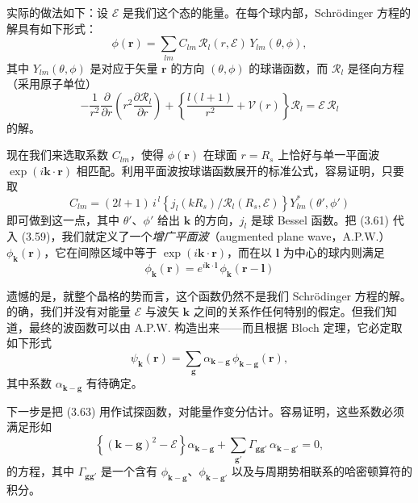 实际的做法如下：设 $\mathcal{E}$ 是我们这个态的能量。在每个球内部，Schrödinger 方程的解具有如下形式：
\begin{equation*}
\phi(\mathbf{r})=\sum_{lm}C_{lm}\,\mathcal{R}_l(r,\mathcal{E})\,Y_{lm}(\theta,\phi),\tag{3.59}
\end{equation*}
其中 $Y_{lm}(\theta,\phi)$ 是对应于矢量 $\mathbf{r}$ 的方向 $(\theta,\phi)$ 的球谐函数，而 $\mathcal{R}_l$ 是径向方程（采用原子单位）
\begin{equation*}
-\frac{1}{r^2}\frac{\partial}{\partial r}\left(r^2\frac{\partial\mathcal{R}_l}{\partial r}\right)+\left\{\frac{l(l+1)}{r^2}+\mathcal{V}(r)\right\}\mathcal{R}_l=\mathcal{E}\,\mathcal{R}_l\tag{3.60}
\end{equation*}
的解。

现在我们来选取系数 $C_{lm}$，使得 $\phi(\mathbf{r})$ 在球面 $r=R_s$ 上恰好与单一平面波 $\exp(i\mathbf{k}\cdot\mathbf{r})$ 相匹配。利用平面波按球谐函数展开的标准公式，容易证明，只要取
\begin{equation*}
C_{lm}=(2l+1)\,i^{\,l}\left\{j_l(kR_s)\big/\mathcal{R}_l(R_s,\mathcal{E})\right\}Y_{lm}^{*}(\theta',\phi')\tag{3.61}
\end{equation*}
即可做到这一点，其中 $\theta'$、$\phi'$ 给出 $\mathbf{k}$ 的方向，$j_l$ 是球 Bessel 函数。把 (3.61) 代入 (3.59)，我们就定义了一个\emph{增广平面波}（augmented plane wave，A.P.W.）$\phi_{\mathbf{k}}(\mathbf{r})$，它在间隙区域中等于 $\exp(i\mathbf{k}\cdot\mathbf{r})$，而在以 $\mathbf{l}$ 为中心的球内则满足
\begin{equation*}
\phi_{\mathbf{k}}(\mathbf{r})=e^{i\mathbf{k}\cdot\mathbf{l}}\,\phi_{\mathbf{k}}(\mathbf{r}-\mathbf{l})\tag{3.62}
\end{equation*}

遗憾的是，就整个晶格的势而言，这个函数仍然不是我们 Schrödinger 方程的解。的确，我们并没有对能量 $\mathcal{E}$ 与波矢 $\mathbf{k}$ 之间的关系作任何特别的假定。但我们知道，最终的波函数可以由 A.P.W. 构造出来——而且根据 Bloch 定理，它必定取如下形式
\begin{equation*}
\psi_{\mathbf{k}}(\mathbf{r})=\sum_{\mathbf{g}}\alpha_{\mathbf{k}-\mathbf{g}}\,\phi_{\mathbf{k}-\mathbf{g}}(\mathbf{r}),\tag{3.63}
\end{equation*}
其中系数 $\alpha_{\mathbf{k}-\mathbf{g}}$ 有待确定。

下一步是把 (3.63) 用作试探函数，对能量作变分估计。容易证明，这些系数必须满足形如
\begin{equation*}
\left\{(\mathbf{k}-\mathbf{g})^2-\mathcal{E}\right\}\alpha_{\mathbf{k}-\mathbf{g}}+\sum_{\mathbf{g}'}\Gamma_{\mathbf{gg}'}\,\alpha_{\mathbf{k}-\mathbf{g}'}=0,\tag{3.64}
\end{equation*}
的方程，其中 $\Gamma_{\mathbf{gg}'}$ 是一个含有 $\phi_{\mathbf{k}-\mathbf{g}}$、$\phi_{\mathbf{k}-\mathbf{g}'}$ 以及与周期势相联系的哈密顿算符的积分。

